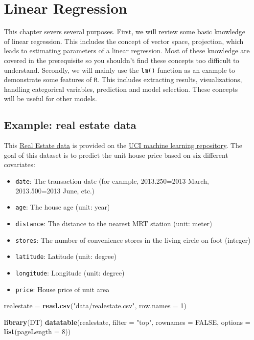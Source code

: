 \documentclass[
]{book}
\newenvironment{Shaded}{\begin{snugshade}}{\end{snugshade}}
\newcommand{\DataTypeTok}[1]{\textcolor[rgb]{0.13,0.29,0.53}{#1}}
\newcommand{\DecValTok}[1]{\textcolor[rgb]{0.00,0.00,0.81}{#1}}
\newcommand{\KeywordTok}[1]{\textcolor[rgb]{0.13,0.29,0.53}{\textbf{#1}}}
\newcommand{\NormalTok}[1]{#1}
\newcommand{\OtherTok}[1]{\textcolor[rgb]{0.56,0.35,0.01}{#1}}
\newcommand{\StringTok}[1]{\textcolor[rgb]{0.31,0.60,0.02}{#1}}
\providecommand{\tightlist}{%
  \setlength{\itemsep}{0pt}\setlength{\parskip}{0pt}}
\begin{document}
\hypertarget{linear-regression}{%
\chapter{Linear Regression}\label{linear-regression}}

This chapter severs several purposes. First, we will review some basic knowledge of linear regression. This includes the concept of vector space, projection, which leads to estimating parameters of a linear regression. Most of these knowledge are covered in the prerequisite so you shouldn't find these concepts too difficult to understand. Secondly, we will mainly use the \texttt{lm()} function as an example to demonstrate some features of \texttt{R}. This includes extracting results, visualizations, handling categorical variables, prediction and model selection. These concepts will be useful for other models.

\hypertarget{example-real-estate-data}{%
\section{Example: real estate data}\label{example-real-estate-data}}

This \href{https://archive.ics.uci.edu/ml/datasets/Real+estate+valuation+data+set}{Real Estate data} is provided on the \href{https://archive.ics.uci.edu/ml/index.php}{UCI machine learning repository}. The goal of this dataset is to predict the unit house price based on six different covariates:

\begin{itemize}
\tightlist
\item
  \texttt{date}: The transaction date (for example, 2013.250=2013 March, 2013.500=2013 June, etc.)
\item
  \texttt{age}: The house age (unit: year)
\item
  \texttt{distance}: The distance to the nearest MRT station (unit: meter)
\item
  \texttt{stores}: The number of convenience stores in the living circle on foot (integer)
\item
  \texttt{latitude}: Latitude (unit: degree)
\item
  \texttt{longitude}: Longitude (unit: degree)
\item
  \texttt{price}: House price of unit area
\end{itemize}

\begin{Shaded}
\begin{Highlighting}[]
\NormalTok{    realestate =}\StringTok{ }\KeywordTok{read.csv}\NormalTok{(}\StringTok{"data/realestate.csv"}\NormalTok{, }\DataTypeTok{row.names =} \DecValTok{1}\NormalTok{)}

    \KeywordTok{library}\NormalTok{(DT)}
    \KeywordTok{datatable}\NormalTok{(realestate, }\DataTypeTok{filter =} \StringTok{"top"}\NormalTok{, }\DataTypeTok{rownames =} \OtherTok{FALSE}\NormalTok{,}
              \DataTypeTok{options =} \KeywordTok{list}\NormalTok{(}\DataTypeTok{pageLength =} \DecValTok{8}\NormalTok{))}
\end{Highlighting}
\end{Shaded}
\end{document}
